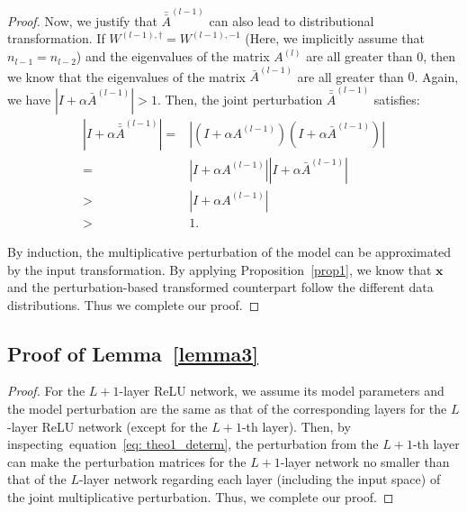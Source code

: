 \documentclass{article} \usepackage{iclr2022_conference,times}
\def\eqref#1{equation~\ref{#1}}
\begin{document}
\begin{proof}
Now, we justify that $\bar{\bar{A}}^{(l-1)}$ can also lead to distributional transformation. If $W^{(l-1),\dagger}=W^{(l-1),-1}$ (Here, we implicitly assume that $n_{l-1}=n_{l-2}$) and the eigenvalues of the matrix $A^{(l)}$ are all greater than $0$, then we know that the eigenvalues of the matrix $\bar{A}^{(l-1)}$ are all greater than $0$. Again, we have $\left\lvert I+\alpha \bar{A}^{(l-1)}\right\rvert>1$. {Then, the joint perturbation $\bar{\bar{A}}^{(l-1)}$ satisfies:
}
\begin{align}
 {\left\lvert I+\alpha \bar{\bar{A}}^{(l-1)}\right\rvert=}&{\left\lvert(I+\alpha {A}^{(l-1)})(I+\alpha \bar{A}^{(l-1)})\right\rvert} \\
 {=}& {\left\lvert I+\alpha {A}^{(l-1)}\right\rvert \left\lvert I+\alpha \bar{A}^{(l-1)}\right\rvert} \label{eq: theo1_determ}\\
 {>}& {\left\lvert I+\alpha {A}^{(l-1)}\right\rvert} \\
 {>}& {1.}
\end{align}
 

By induction, the multiplicative perturbation of the model can be approximated by the input transformation. By applying Proposition~\ref{prop1}, we know that $\boldsymbol{x}$ and the perturbation-based transformed counterpart follow the different data distributions. Thus we complete our proof.
\end{proof}


\subsection{Proof of Lemma~\ref{lemma3}} \label{app: proof2}

\begin{proof}
For the $L+1$-layer ReLU network, we assume its model parameters and the model perturbation are the same as that of the corresponding layers for the $L$-layer ReLU network (except for the $L+1$-th layer). {Then, by inspecting~\eqref{eq: theo1_determ}, the perturbation from the $L+1$-th layer can make the perturbation matrices for the $L+1$-layer network no smaller than that of the $L$-layer network regarding each layer (including the input space) of the joint multiplicative perturbation.} Thus, we complete our proof. 
\end{proof}
\end{document}
